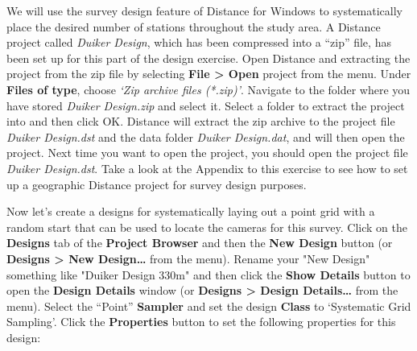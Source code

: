 \documentclass[a4paper, 10pt]{article}
\begin{document}
We will use the survey design feature of Distance for Windows to systematically place the desired number of stations throughout the study area. A Distance project called \emph{Duiker Design}, which has been compressed into a “zip” file, has been set up for this part of the design exercise. Open Distance and extracting the project from the zip file by selecting \textbf{File > Open} project from the menu. Under \textbf{Files of type}, choose \emph{‘Zip archive files (*.zip)’}. Navigate to the folder where you have stored \emph{Duiker Design.zip} and select it. Select a folder to extract the project into and then click OK. Distance will extract the zip archive to the project file \emph{Duiker Design.dst} and the data folder \emph{Duiker Design.dat}, and will then open the project. Next time you want to open the project, you should open the project file \emph{Duiker Design.dst}.  Take a look at the Appendix to this exercise to see how to set up a geographic Distance project for survey design purposes.

Now let’s create a designs for systematically laying out a point grid with a random start that can be used to locate the cameras for this survey. Click on the \textbf{Designs} tab of the \textbf{Project Browser} and then the \textbf{New Design} button (or \textbf{Designs > New Design…} from the menu). Rename your "New Design" something like "Duiker Design 330m" and then click the \textbf{Show Details} button to open the \textbf{Design Details} window (or \textbf{Designs > Design Details…} from the menu). Select the “Point” \textbf{Sampler} and set the design \textbf{Class} to ‘Systematic Grid Sampling’. Click the \textbf{Properties} button to set the following properties for this design:
\end{document}
